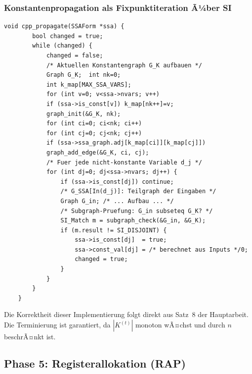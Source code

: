 ﻿\documentclass[a4paper,12pt]{article}
\theoremstyle{definition}
\begin{document}
\subsubsection{Konstantenpropagation als Fixpunktiteration Ã¼ber SI}

\begin{lstlisting}[style=cstyle, caption={CPP -- iterative SI-PrÃ¼fung
		(compiler\_full.c)}, label=lst:cpp-impl]
	void cpp_propagate(SSAForm *ssa) {
		bool changed = true;
		while (changed) {
			changed = false;
			/* Aktuellen Konstantengraph G_K aufbauen */
			Graph G_K;  int nk=0;
			int k_map[MAX_SSA_VARS];
			for (int v=0; v<ssa->nvars; v++)
			if (ssa->is_const[v]) k_map[nk++]=v;
			graph_init(&G_K, nk);
			for (int ci=0; ci<nk; ci++)
			for (int cj=0; cj<nk; cj++)
			if (ssa->ssa_graph.adj[k_map[ci]][k_map[cj]])
			graph_add_edge(&G_K, ci, cj);
			/* Fuer jede nicht-konstante Variable d_j */
			for (int dj=0; dj<ssa->nvars; dj++) {
				if (ssa->is_const[dj]) continue;
				/* G_SSA[In(d_j)]: Teilgraph der Eingaben */
				Graph G_in; /* ... Aufbau ... */
				/* Subgraph-Pruefung: G_in subseteq G_K? */
				SI_Match m = subgraph_check(&G_in, &G_K);
				if (m.result != SI_DISJOINT) {
					ssa->is_const[dj]  = true;
					ssa->const_val[dj] = /* berechnet aus Inputs */0;
					changed = true;
				}
			}
		}
	}
\end{lstlisting}

Die Korrektheit dieser Implementierung folgt direkt aus Satz~8 der
Hauptarbeit. Die Terminierung ist garantiert, da $|K^{(t)}|$ monoton wÃ¤chst
und durch $n$ beschrÃ¤nkt ist.

\subsection{Phase 5: Registerallokation (RAP)}
\label{sec:impl-rap}
\end{document}
